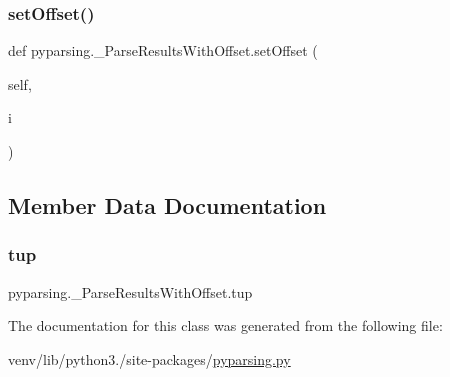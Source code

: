 \subsubsection{\texorpdfstring{set\+Offset()}{setOffset()}}
{\footnotesize\ttfamily def pyparsing.\+\_\+\+Parse\+Results\+With\+Offset.\+set\+Offset (\begin{DoxyParamCaption}\item[{}]{self,  }\item[{}]{i }\end{DoxyParamCaption})}



\subsection{Member Data Documentation}
\mbox{\label{classpyparsing_1_1__ParseResultsWithOffset_ab392daf3e9d05b243265c56d310a24ca}} 
\subsubsection{\texorpdfstring{tup}{tup}}
{\footnotesize\ttfamily pyparsing.\+\_\+\+Parse\+Results\+With\+Offset.\+tup}



The documentation for this class was generated from the following file\+:\begin{DoxyCompactItemize}
\item 
venv/lib/python3./site-\/packages/\hyperlink{pyparsing_8py}{pyparsing.\+py}\end{DoxyCompactItemize}

